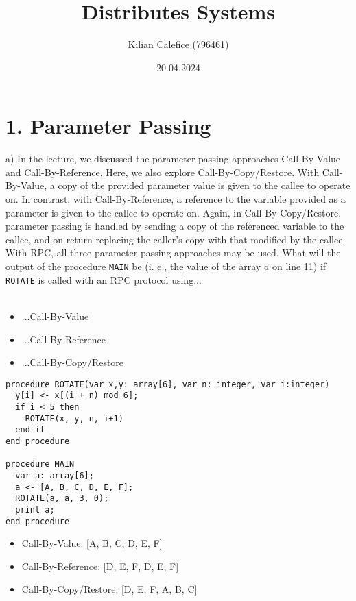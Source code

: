 \documentclass{article}
\title{Distributes Systems}
\author{Kilian Calefice (796461)}
\date{20.04.2024}
\begin{document}
\maketitle

\section*{1. Parameter Passing}

a) In the lecture, we discussed the parameter passing approaches Call-By-Value and Call-By-Reference.
Here, we also explore Call-By-Copy/Restore. With Call-By-Value, a copy of the provided parameter value is
given to the callee to operate on. In contrast, with Call-By-Reference, a reference to the variable 
provided as a parameter is given to the callee to operate on. Again, in Call-By-Copy/Restore, parameter
passing is handled by sending a copy of the referenced variable to the callee, and on return replacing
the caller's copy with that modified by the callee.\\
With RPC, all three parameter passing approaches may be used. What will the output of the procedure 
\texttt{MAIN} be (i. e., the value of the array $a$ on line 11) if \texttt{ROTATE} is called with an RPC
protocol using...\\
\\
\begin{itemize}
  \item ...Call-By-Value\\
  \item ...Call-By-Reference\\
  \item ...Call-By-Copy/Restore
\end{itemize}
\begin{lstlisting}[style=CStyle]
procedure ROTATE(var x,y: array[6], var n: integer, var i:integer)
  y[i] <- x[(i + n) mod 6];
  if i < 5 then
    ROTATE(x, y, n, i+1)
  end if
end procedure

procedure MAIN
  var a: array[6];
  a <- [A, B, C, D, E, F];
  ROTATE(a, a, 3, 0);
  print a;
end procedure
\end{lstlisting}
\begin{itemize}
  \item Call-By-Value: [A, B, C, D, E, F]\\
  \item Call-By-Reference: [D, E, F, D, E, F]\\
  \item Call-By-Copy/Restore: [D, E, F, A, B, C]
\end{itemize}
\end{document}
